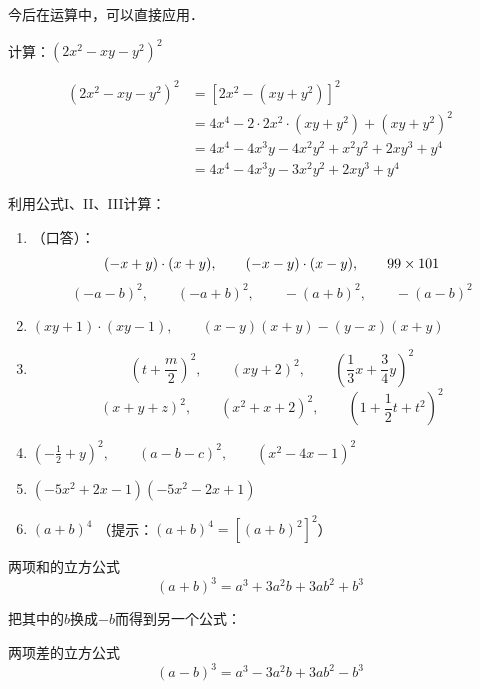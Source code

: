 今后在运算中，可以直接应用．

\begin{example}
    计算：$(2x^2-xy-y^2)^2$
\end{example}

\begin{solution}
    \[\begin{split}
(2x^2-xy-y^2)^2 &= [2x^2-(xy+y^2)]^2\\
&=4x^4-2\cdot 2x^2\cdot (xy+y^2)+  (xy+y^2)^2\\
&=     4x^4-4x^3y-4x^2y^2+x^2y^2+2xy^3+y^4\\ 
&=       4x^4-4x^3y-3x^2y^2+2xy^3+y^4
    \end{split}\]
\end{solution}

\begin{ex}
    利用公式I、II、III计算：
\begin{enumerate}
    \item （口答）：
    \[(-x+y)\cdot (x+y), \qquad (-x-y)\cdot (x-y),\qquad 99\times 101\]
    \[(-a-b)^2,\qquad (-a+b)^2,\qquad -(a+b)^2,\qquad -(a-b)^2 \]

    \item $(xy+1)\cdot (xy-1),\qquad (x-y)(x+y)-(y-x)(x+y)$
    \item \[\left(t+\frac{m}{2}\right)^2,\qquad (xy+2)^2,\qquad \left(\frac{1}{3}x+\frac{3}{4}y\right)^2\]
     \[(x+y+z)^2,\qquad (x^2+x+2)^2,\qquad \left(1+\frac{1}{2}t+t^2\right)^2\]
\item $\left(-\frac{1}{2}+y\right)^2,\qquad (a-b-c)^2,\qquad (x^2-4x-1)^2$
\item $(-5x^2+2x-1)(-5x^2-2x+1)$
\item $(a+b)^4$  （提示：$(a+b)^4=[(a+b)^2]^2$）
    \end{enumerate}
\end{ex}

\begin{blk}{两项和的立方公式}
    \begin{equation*}
        (a+b)^3=a^3+3a^2b+3ab^2+b^3 \tag{IV}
    \end{equation*}
\end{blk}

把其中的$b$换成$-b$而得到另一个公式：

\begin{blk}{两项差的立方公式}
    \begin{equation*}
        (a-b)^3=a^3-3a^2b+3ab^2-b^3 \tag{V}  
    \end{equation*}
\end{blk}

